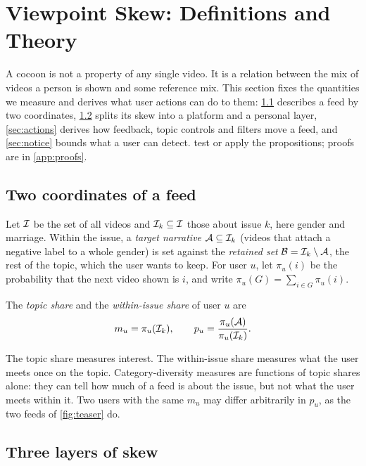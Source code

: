\section{Viewpoint Skew: Definitions and Theory}
\label{sec:framework}

A cocoon is not a property of any single video. It is a relation between the mix of videos a person is shown and some reference mix. This section fixes the quantities we measure and derives what user actions can do to them: \cref{sec:coords} describes a feed by two coordinates, \cref{sec:layers} splits its skew into a platform and a personal layer, \cref{sec:actions} derives how feedback, topic controls and filters move a feed, and \cref{sec:notice} bounds what a user can detect.  test or apply the propositions; proofs are in \cref{app:proofs}.

\subsection{Two coordinates of a feed}
\label{sec:coords}

Let $\mathcal{I}$ be the set of all videos and $\mathcal{I}_k\subseteq\mathcal{I}$ those about issue $k$, here gender and marriage. Within the issue, a \emph{target narrative} $\mathcal{A}\subseteq\mathcal{I}_k$ (videos that attach a negative label to a whole gender) is set against the \emph{retained set} $\mathcal{B}=\mathcal{I}_k\setminus\mathcal{A}$, the rest of the topic, which the user wants to keep. For user $u$, let $\pi_u(i)$ be the probability that the next video shown is $i$, and write $\pi_u(G)=\sum_{i\in G}\pi_u(i)$.

\begin{definition}
The \emph{topic share} and the \emph{within-issue share} of user $u$ are
\begin{equation}
  m_u=\pi_u(\mathcal{I}_k),\qquad p_u=\frac{\pi_u(\mathcal{A})}{\pi_u(\mathcal{I}_k)} .
\end{equation}
\end{definition}

The topic share measures interest. The within-issue share measures what the user meets once on the topic. Category-diversity measures are functions of topic shares alone: they can tell how much of a feed is about the issue, but not what the user meets within it. Two users with the same $m_u$ may differ arbitrarily in $p_u$, as the two feeds of \cref{fig:teaser} do.

\subsection{Three layers of skew}
\label{sec:layers}

